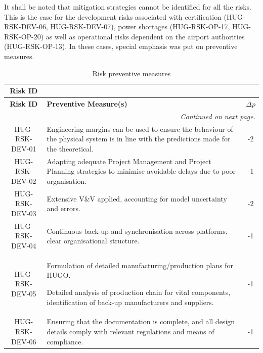 It shall be noted that mitigation strategies cannot be identified for all the risks. This is the case for the development risks associated with certification (HUG-RSK-DEV-06, HUG-RSK-DEV-07), power shortages (HUG-RSK-OP-17, HUG-RSK-OP-20) as well as operational risks dependent on the airport authorities (HUG-RSK-OP-13).  In these cases, special emphasis was put on preventive measures.



\begin{longtable}{|c|p{12cm}|c|}
\caption{Risk preventive measures}
\label{tab:risk_preventive_measures} \\

\hline
\textbf{Risk ID} & \centering{\textbf{Preventive Measure(s)}} & \centering{\textbf{$\Delta p$}} \tabularnewline
\hline\hline
\endfirsthead

\hline
\textbf{Risk ID} & \centering\textbf{Preventive Measure(s)} & \textbf{$\Delta p$} \\
\hline\hline
\endhead

\hline
\multicolumn{3}{r}{\textit{Continued on next page.}} \\
\endfoot

\hline
\endlastfoot
HUG-RSK-DEV-01 &  Engineering margins can be used to ensure the behaviour of the physical system is in line with the predictions made for the theoretical. & -2  \\ \hline
         HUG-RSK-DEV-02 & Adapting adequate Project Management and Project Planning strategies to minimise avoidable delays due to poor organisation. & -1  \\ \hline
         HUG-RSK-DEV-03 & Extensive V\&V applied, accounting for model uncertainty and errors. & -2  \\ \hline
         HUG-RSK-DEV-04 & Continuous back-up and synchronisation across platforms, clear organisational structure. & -1  \\ \hline
         HUG-RSK-DEV-05 & Formulation of detailed manufacturing/production plans for HUGO.
         
         Detailed analysis of production chain for vital components, identification of back-up manufacturers and suppliers. & -1 \\ \hline
        
HUG-RSK-DEV-06 & Ensuring that the documentation is complete, and all design details comply with relevant regulations and means of compliance.
& -1 \\ \hline


\end{longtable}

